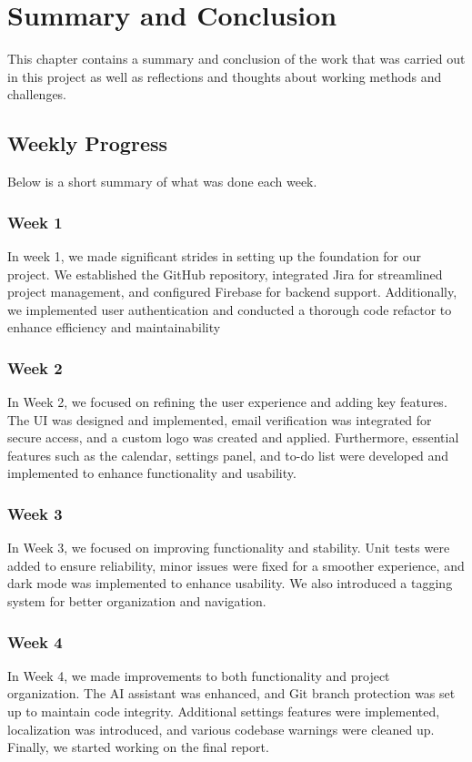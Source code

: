 \documentclass{article}
\begin{document}
\section{Summary and Conclusion}
This chapter contains a summary and conclusion of the work that was carried out in this project as well as reflections and thoughts about working methods and challenges.

\subsection{Weekly Progress}
Below is a short summary of what was done each week.

\subsubsection{Week 1}
In week 1, we made significant strides in setting up the foundation for our project.
We established the GitHub repository, integrated Jira for streamlined project management, and configured Firebase for backend support.
Additionally, we implemented user authentication and conducted a thorough code refactor to enhance efficiency and maintainability

\subsubsection{Week 2}
In Week 2, we focused on refining the user experience and adding key features.
The UI was designed and implemented, email verification was integrated for secure access, and a custom logo was created and applied.
Furthermore, essential features such as the calendar, settings panel, and to-do list were developed and implemented to enhance functionality and usability.

\subsubsection{Week 3}
In Week 3, we focused on improving functionality and stability.
Unit tests were added to ensure reliability, minor issues were fixed for a smoother experience, and dark mode was implemented to enhance usability.
We also introduced a tagging system for better organization and navigation.

\subsubsection{Week 4}
In Week 4, we made improvements to both functionality and project organization.
The AI assistant was enhanced, and Git branch protection was set up to maintain code integrity.
Additional settings features were implemented, localization was introduced, and various codebase warnings were cleaned up.
Finally, we started working on the final report.
\end{document}
